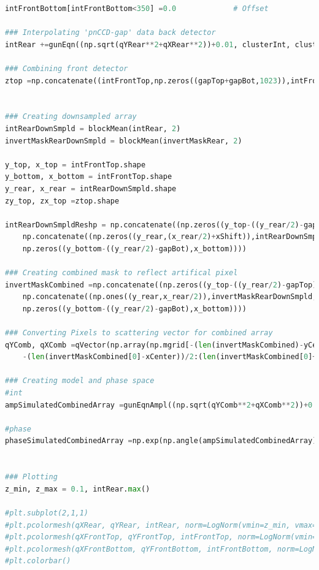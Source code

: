 \begin{lstlisting}[language=Python,frame=single,basicstyle=\footnotesize]
intFrontBottom[intFrontBottom<350] =0.0             # Offset

### Interpolating 'pnCCD-gap' data back detector
intRear +=gunEqn((np.sqrt(qYRear**2+qXRear**2))+0.01, clusterInt, clusterSize)*invertMaskRear

### Combining front detector
ztop =np.concatenate((intFrontTop,np.zeros((gapTop+gapBot,1023)),intFrontBottom))


### Creating downsampled array
intRearDownSmpld = blockMean(intRear, 2)
invertMaskRearDownSmpld = blockMean(invertMaskRear, 2)

y_top, x_top = intFrontTop.shape
y_bottom, x_bottom = intFrontTop.shape
y_rear, x_rear = intRearDownSmpld.shape
zy_top, zx_top =ztop.shape

intRearDownSmpldReshp = np.concatenate((np.zeros((y_top-((y_rear/2)-gapTop),x_top)),
    np.concatenate((np.zeros((y_rear,(x_rear/2)+xShift)),intRearDownSmpld,np.zeros((y_rear,(x_rear/2)-xShift-1))), axis=1),
    np.zeros((y_bottom-((y_rear/2)-gapBot),x_bottom))))

### Creating combined mask to reflect artifical pixel
invertMaskCombined =np.concatenate((np.zeros((y_top-((y_rear/2)-gapTop),x_top)),
    np.concatenate((np.ones((y_rear,x_rear/2)),invertMaskRearDownSmpld,np.ones((y_rear,x_rear/2 -1))), axis=1),
    np.zeros((y_bottom-((y_rear/2)-gapBot),x_bottom))))

### Converting Pixels to scattering vector for combined array
qYComb, qXComb =qVector(np.array(np.mgrid[-(len(invertMaskCombined)-yCenter)/2:(len(invertMaskCombined)+yCenter)/2,
    -(len(invertMaskCombined[0]-xCenter))/2:(len(invertMaskCombined[0]+xCenter))/2]),pixelSize=pixelSizePnccd, distanceToDetector=distanceOfFrontPnccd, waveLength=scatteredWaveLength)

### Creating model and phase space
#int
ampSimulatedCombinedArray =gunEqnAmpl((np.sqrt(qYComb**2+qXComb**2))+0.01, clusterInt, clusterSize)

#phase
phaseSimulatedCombinedArray =np.exp(np.angle(ampSimulatedCombinedArray)*I)


### Plotting
z_min, z_max = 0.1, intRear.max()

#plt.subplot(2,1,1)
#plt.pcolormesh(qXRear, qYRear, intRear, norm=LogNorm(vmin=z_min, vmax=z_max), cmap='plasma')
#plt.pcolormesh(qXFrontTop, qYFrontTop, intFrontTop, norm=LogNorm(vmin=z_min, vmax=z_max), cmap='plasma')
#plt.pcolormesh(qXFrontBottom, qYFrontBottom, intFrontBottom, norm=LogNorm(vmin=z_min, vmax=z_max), cmap='plasma')
#plt.colorbar()


\end{lstlisting}
